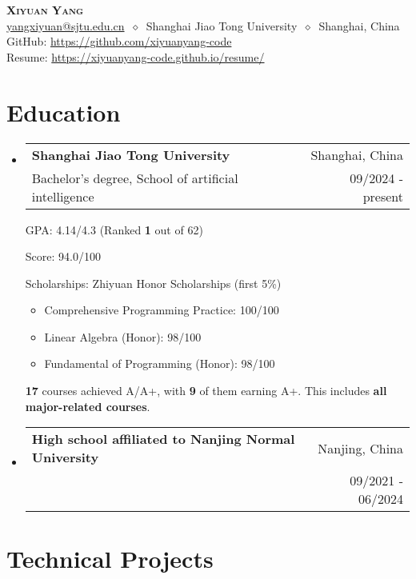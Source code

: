 \documentclass[letterpaper,11pt]{article}
\makeatletter
\newcommand{\cvheading}[4]{
  \vspace{-2pt}\item
    \begin{tabular*}{\textwidth}[t]{l@{\extracolsep{\fill}}r}
      \textbf{#1} & #2 \\
      \small#3 & \small #4 \\
    \end{tabular*}\vspace{-7pt}
}
\newcommand{\cvheadingstart}{\begin{itemize}[leftmargin=0in, label={}]}
\newcommand{\cvheadingend}{\end{itemize}}
\makeatother
\begin{document}
\begin{center}
  \textbf{\LARGE\scshape Xiyuan Yang} \\
  \vspace{1pt}\small
  \href{mailto:yangxiyuan@sjtu.edu.cn}{yangxiyuan@sjtu.edu.cn}
  $\ \diamond\ $
  Shanghai Jiao Tong University
  $\ \diamond\ $
  Shanghai, China
  \\
  GitHub: \href{https://github.com/xiyuanyang-code}{https://github.com/xiyuanyang-code}
  \\
  Resume: \href{https://xiyuanyang-code.github.io/resume}{https://xiyuanyang-code.github.io/resume/}
\end{center}



\section{Education}
\cvheadingstart
\cvheading
{Shanghai Jiao Tong University}{Shanghai, China}
{Bachelor's degree, School of artificial intelligence}{09/2024 - present}

GPA: 4.14/4.3 (Ranked \textbf{1} out of 62)

Score: 94.0/100

Scholarships: Zhiyuan Honor Scholarships (first 5\%)

\begin{itemize}[nosep]
  \item Comprehensive Programming Practice: 100/100
  \item Linear Algebra (Honor): 98/100
  \item Fundamental of Programming (Honor): 98/100
\end{itemize}
\textbf{17} courses achieved A/A+, with \textbf{9} of them earning A+. This includes \textbf{all major-related courses}.
\cvheading
{High school affiliated to Nanjing Normal University}{Nanjing, China}
{}{09/2021 - 06/2024}
\cvheadingend
\vspace{-5pt}




\section{Technical Projects}
\end{document}
